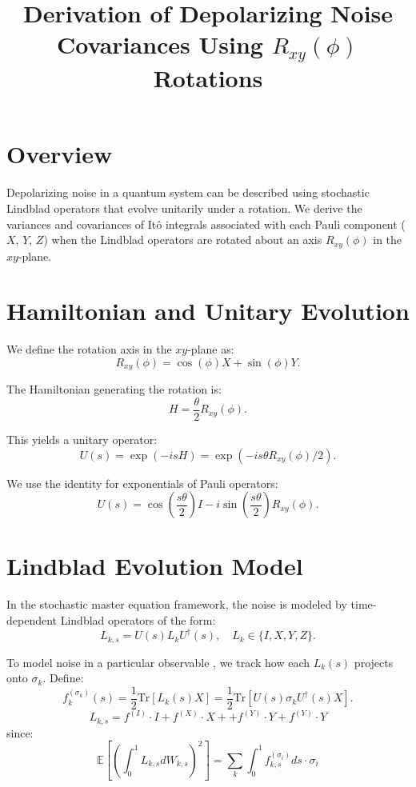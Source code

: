 \documentclass[12pt]{article}
\title{Derivation of Depolarizing Noise Covariances Using $R_{xy}(\phi)$ Rotations}
\author{}
\date{}
\begin{document}
\maketitle

\section*{Overview}
Depolarizing noise in a quantum system can be described using stochastic Lindblad operators that evolve unitarily under a rotation. We derive the variances and covariances of It\^o integrals associated with each Pauli component ($X$, $Y$, $Z$) when the Lindblad operators are rotated about an axis $R_{xy}(\phi)$ in the $xy$-plane.

\section*{Hamiltonian and Unitary Evolution}
We define the rotation axis in the $xy$-plane as:
\begin{equation}
R_{xy}(\phi) = \cos(\phi) X + \sin(\phi) Y.
\end{equation}

The Hamiltonian generating the rotation is:
\begin{equation}
H = \frac{\theta}{2} R_{xy}(\phi).
\end{equation}

This yields a unitary operator:
\begin{equation}
U(s) = \exp\left(-i s H\right) = \exp\left(-i s\theta R_{xy}(\phi)/2\right).
\end{equation}

We use the identity for exponentials of Pauli operators:
\begin{equation}
U(s) = \cos\left(\frac{s\theta}{2}\right) I - i \sin\left(\frac{s\theta}{2}\right) R_{xy}(\phi).
\end{equation}

\section*{Lindblad Evolution Model}
In the stochastic master equation framework, the noise is modeled by time-dependent Lindblad operators of the form:
\begin{equation}
L_{k,s} = U(s) L_k U^\dagger(s), \quad L_k \in \{I, X, Y, Z\}.
\end{equation}

To model noise in a particular observable , we track how each $L_k(s)$ projects onto $\sigma_k$. Define:
\begin{equation}
f_k^{(\sigma_k)}(s) = \frac{1}{2} \text{Tr}[L_k(s) X] = \frac{1}{2} \text{Tr}[U(s) \sigma_k U^\dagger(s) X].
\end{equation}
\[
L_{k,s} = f^{(I)} \cdot I + f^{(X)} \cdot X + + f^{(Y)} \cdot Y + f^{(Y)} \cdot Y
\]
since:
\[
\mathbb{E}[(\int_0^1 L_{k,s} dW_{k,s})^2] = \sum_k \int_0^1 f^{(\sigma_i)}_{k,s} ds \cdot \sigma_i
\]
\end{document}

